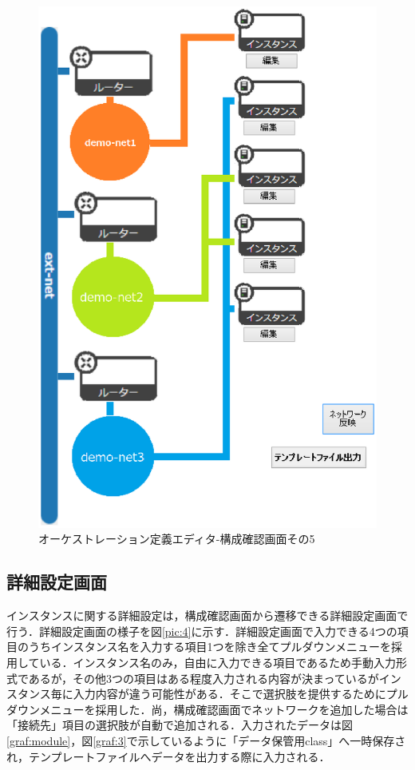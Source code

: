 \documentclass[mingoth]{kut-paper}		%
\begin{document}
		\begin{figure}[H]
			\begin{center}
				\includegraphics[scale=0.55]{Document/構成確認画面ex2.eps}
				\caption{オーケストレーション定義エディタ-構成確認画面その5}
				\label{pic:6}
			\end{center}
		\end{figure}
		
		
		\subsection{詳細設定画面}
		インスタンスに関する詳細設定は，構成確認画面から遷移できる詳細設定画面で行う．詳細設定画面の様子を図\ref{pic:4}に示す．詳細設定画面で入力できる4つの項目のうちインスタンス名を入力する項目1つを除き全てプルダウンメニューを採用している．インスタンス名のみ，自由に入力できる項目であるため手動入力形式であるが，その他3つの項目はある程度入力される内容が決まっているがインスタンス毎に入力内容が違う可能性がある．そこで選択肢を提供するためにプルダウンメニューを採用した．尚，構成確認画面でネットワークを追加した場合は「接続先」項目の選択肢が自動で追加される．入力されたデータは図\ref{graf:module}，図\ref{graf:3}で示しているように「データ保管用class」へ一時保存され，テンプレートファイルへデータを出力する際に入力される．
		
\end{document}
